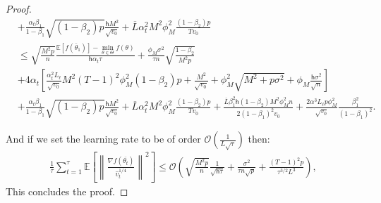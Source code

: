 \documentclass[11pt]{article}
\def\EE{\mathbb{E}}
\def\tot{\mathsf{h}}
\begin{document}
\begin{proof}
\begin{align*}
   &  +\frac{\alpha_t \beta_1}{1-\beta_1}  \sqrt{(1-\beta_2)p} \frac{\tot M^2}{\sqrt{v_0}} +\overline{L} \alpha_t^2 M^2 \phi_M^2 \frac{(1-\beta_2)p}{Tv_0} \nonumber\\
   & \leq   \sqrt{\frac{M^2 p}{n}}  \frac{ \EE[f(\bar{\theta}_1)]  - \min \limits_{\theta \in \Theta} f(\theta)}{\tot \alpha_t \tau} +      \frac{\phi_M   \sigma^2}{\tau n} \sqrt{\frac{1 - \beta_2}{M^2 p}  } \nonumber\\
    &   +4\alpha_t \left[ \frac{\alpha_t^2 L_\ell}{\sqrt{v_0}}  M^2 (T-1)^2 \phi_M^2 (1-\beta_2)p + \frac{M^2}{\sqrt{v_0}}+\phi_M^2\sqrt{M^2+p\sigma^2} + \phi_M \frac{\tot \sigma^2}{\sqrt{n}}\right]   \nonumber\\
   &  +\frac{\alpha_t \beta_1}{1-\beta_1}  \sqrt{(1-\beta_2)p} \frac{\tot M^2}{\sqrt{v_0}} +\overline{L} \alpha_t^2 M^2 \phi_M^2 \frac{(1-\beta_2)p}{Tv_0}  + \frac{ \overline{L}\beta_1^2\tot(1-\beta_2)M^2 \phi^2_M n}{2(1-\beta_1)^2 v_0}  +\frac{2\alpha^3 L_\ell p\phi_M^2}{ \sqrt{v_0}}\frac{\beta_1^2}{(1-\beta_1)^2}.
\end{align*}

 And if we set the learning rate to be of order $\mathcal{O}(\frac{1}{L \sqrt{\tau}})$ then:
 \begin{align*}
     \frac{1}{\tau}\sum_{t=1}^\tau  \EE\left[ \left\| \frac{\nabla f(\overline{\theta_t})}{\hat v_t^{1/4}}   \right \|^2 \right] \leq \mathcal{O}\left( \sqrt{\frac{M^2 p}{n}} \frac{1}{\sqrt{\tot \tau}} + \frac{\sigma^2 }{\tau n\sqrt{p}}+\frac{(T-1)^2p}{\tau^{3/2}L^3}\right),
 \end{align*}
This concludes the proof.

\end{proof}
\end{document}
